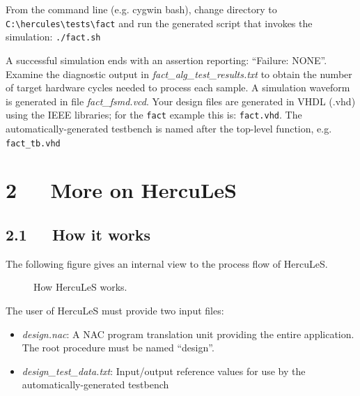 \documentclass[a4paper]{article}
\providecommand*{\DUroletitlereference}[1]{\textsl{#1}}
\begin{document}
\begin{list}{.}
\item From the command line (e.g. cygwin bash), change directory to
\texttt{C:\textbackslash{}hercules\textbackslash{}tests\textbackslash{}fact} and run the generated script that invokes the simulation:
\texttt{./fact.sh}

\item A successful simulation ends with an assertion reporting: ``Failure: NONE''.
Examine the diagnostic output in \DUroletitlereference{fact\_alg\_test\_results.txt} to obtain the number
of target hardware cycles needed to process each sample.
A simulation waveform is generated in file \DUroletitlereference{fact\_fsmd.vcd}.
Your design files are generated in VHDL (.vhd) using the IEEE libraries; for
the \texttt{fact} example this is: \texttt{fact.vhd}.
The automatically-generated testbench is named after the top-level function,
e.g. \texttt{fact\_tb.vhd}
\end{list}


\section{2~~~More on HercuLeS%
  \label{more-on-hercules}%
}


\subsection{2.1~~~How it works%
  \label{how-it-works}%
}

The following figure gives an internal view to the process flow of HercuLeS.
\begin{figure}
\noindent{}
\caption{How HercuLeS works.}
\end{figure}

The user of HercuLeS must provide two input files:
%
\begin{itemize}

\item \DUroletitlereference{design.nac}: A NAC program translation unit providing the entire application.
The root procedure must be named ``design''.

\item \DUroletitlereference{design\_test\_data.txt}: Input/output reference values for use by the
automatically-generated testbench

\end{itemize}
\end{document}
